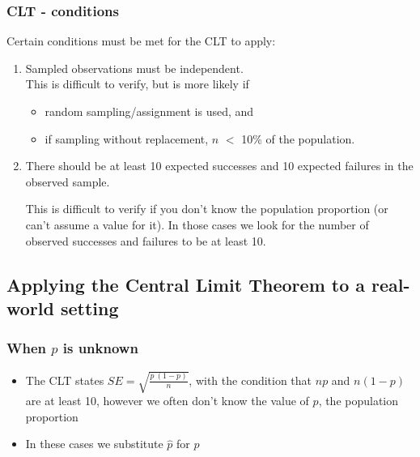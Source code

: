 
\begin{frame}
\frametitle{CLT - conditions}

Certain conditions must be met for the CLT to apply:

\begin{enumerate}

\item {} Sampled observations must be independent. \\

This is difficult to verify, but is more likely if
\begin{itemize}
\item random sampling/assignment is used, and
\item if sampling without replacement, $n$ $<$ 10\% of the population.
\end{itemize}

\pause

\item {} There should be at least 10 expected successes and 10 expected failures in the observed sample.

This is difficult to verify if you don't know the population proportion (or can't assume a value for it). In those cases we look for the number of observed successes and failures to be at least 10.

\end{enumerate}

\end{frame}

\subsection{Applying the Central Limit Theorem to a real-world setting}


\begin{frame}
\frametitle{When $p$ is unknown}

\begin{itemize}

\item The CLT states $SE = \sqrt{\frac{p~(1-p)}{n}}$, with the condition that $np$ and $n(1-p)$ are at least 10, however we often don't know the value of $p$, the population proportion

\item In these cases we substitute $\hat{p}$ for $p$

\end{itemize}

\end{frame}

